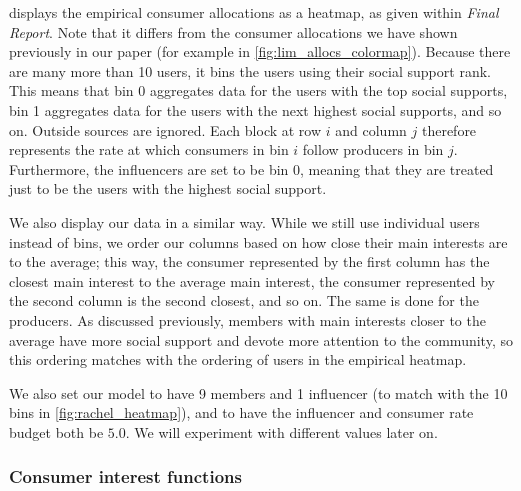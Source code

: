 \documentclass[11pt, letterpaper]{article}
\begin{document}
 displays the empirical consumer allocations as a heatmap, as given within \textit{Final Report}. Note that it differs from the consumer allocations we have shown previously in our paper (for example in \cref{fig:lim_allocs_colormap}). Because there are many more than 10 users, it bins the users using their social support rank. This means that bin 0 aggregates data for the users with the top social supports, bin 1 aggregates data for the users with the next highest social supports, and so on. Outside sources are ignored. Each block at row \(i\) and column \(j\) therefore represents the rate at which consumers in bin \(i\) follow producers in bin \(j\). Furthermore, the influencers are set to be bin 0, meaning that they are treated just to be the users with the highest social support.

We also display our data in a similar way. While we still use individual users instead of bins, we order our columns based on how close their main interests are to the average; this way, the consumer represented by the first column has the closest main interest to the average main interest, the consumer represented by the second column is the second closest, and so on. The same is done for the producers. As discussed previously, members with main interests closer to the average have more social support and devote more attention to the community, so this ordering matches with the ordering of users in the empirical heatmap.

We also set our model to have 9 members and 1 influencer (to match with the 10 bins in \cref{fig:rachel_heatmap}), and to have the influencer and consumer rate budget both be \(5.0\). We will experiment with different values later on. 

\subsubsection{Consumer interest functions}
\end{document}
